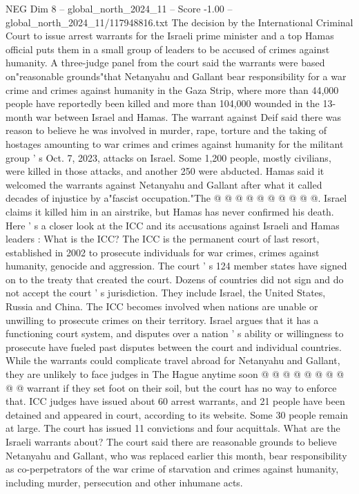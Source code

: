 \begin{textsample}{NEG Dim 8 – global\_north\_2024\_11 – Score -1.00 – global\_north\_2024\_11/117948816.txt}  \label{ex:f8_neg_393}
The decision by the International Criminal Court to issue arrest warrants for the Israeli prime minister and a top Hamas official puts them in a small group of leaders to be accused of crimes against humanity.
A three-judge panel from the court said the warrants were based on"reasonable grounds"that Netanyahu and Gallant bear responsibility for a war crime and crimes against humanity in the Gaza Strip, where more than 44,000 people have reportedly been killed and more than 104,000 wounded in the 13-month war between Israel and Hamas.
The warrant against Deif said there was reason to believe he was involved in murder, rape, torture and the taking of hostages amounting to war crimes and crimes against humanity for the militant group ' s Oct. 7, 2023, attacks on Israel.
Some 1,200 people, mostly civilians, were killed in those attacks, and another 250 were abducted.
Hamas said it welcomed the warrants against Netanyahu and Gallant after what it called decades of injustice by a"fascist occupation."The @ @ @ @ @ @ @ @ @ @.
Israel claims it killed him in an airstrike, but Hamas has never confirmed his death.
Here ' s a closer look at the ICC and its accusations against Israeli and Hamas leaders : What is the ICC?
The ICC is the permanent court of last resort, established in 2002 to prosecute individuals for war crimes, crimes against humanity, genocide and aggression.
The court ' s 124 member states have signed on to the treaty that created the court.
Dozens of countries did not sign and do not accept the court ' s jurisdiction.
They include Israel, the United States, Russia and China.
The ICC becomes involved when nations are unable or unwilling to prosecute crimes on their territory.
Israel argues that it has a functioning court system, and disputes over a nation ' s ability or willingness to prosecute have fueled past disputes between the court and individual countries.
While the warrants could complicate travel abroad for Netanyahu and Gallant, they are unlikely to face judges in The Hague anytime soon @ @ @ @ @ @ @ @ @ @ warrant if they set foot on their soil, but the court has no way to enforce that.
ICC judges have issued about 60 arrest warrants, and 21 people have been detained and appeared in court, according to its website.
Some 30 people remain at large.
The court has issued 11 convictions and four acquittals.
What are the Israeli warrants about?
The court said there are reasonable grounds to believe Netanyahu and Gallant, who was replaced earlier this month, bear responsibility as co-perpetrators of the war crime of starvation and crimes against humanity, including murder, persecution and other inhumane acts.

\end{textsample}
